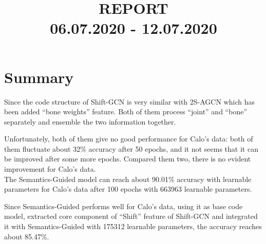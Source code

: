 \documentclass{article}
\title{\textbf{REPORT} \\ 06.07.2020 - 12.07.2020} %
\date{}
\begin{document}
\maketitle %





\section*{Summary}
Since the code structure of Shift-GCN \cite{Cheng_2020_CVPR} is very similar with 2S-AGCN \cite{Shi_2019_CVPR} which has been added \enquote{bone weights} feature. Both of them process \enquote{joint} and \enquote{bone} separately and ensemble the two information together. 


Unfortunately, both of them give no good performance for Calo's data: both of them fluctuate about 32\% accuracy after 50 epochs, and it not seems that it can be improved after some more epochs. Compared them two, there is no evident improvement for Calo's data. \\

The Semantics-Guided \cite{Zhang_2020_CVPR} model can reach about 90.01\% accuracy with learnable parameters for Calo's data after 100 epochs with 663963 learnable parameters. 

Since Semantics-Guided \cite{Zhang_2020_CVPR} performs well for Calo's data, using it as base code model, extracted core component of \enquote{Shift} feature of Shift-GCN \cite{Cheng_2020_CVPR} and integrated it with Semantics-Guided \cite{Zhang_2020_CVPR} with 175312 learnable parameters, the accuracy reaches about 85.47\%. \\
\end{document}
